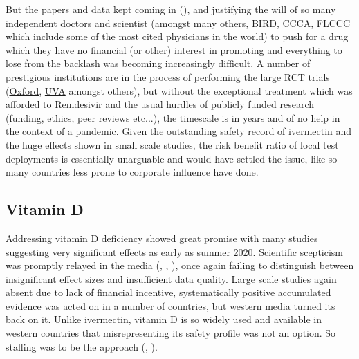 \documentclass[11pt,a4paper]{article}
\begin{document}
But the papers and data kept coming in (\cite{Bryant2021-ww}), and justifying the will of so many independent doctors and scientist (amongst many others, \href{https://bird-group.org/where-it-all-began/}{BIRD}, \href{https://www.canadiancovidcarealliance.org/treatment-protocols/}{CCCA}, \href{https://covid19criticalcare.com/ivermectin-in-covid-19/}{FLCCC} which include some of the most cited physicians in the world) to push for a drug which they have no financial (or other) interest in promoting and everything to lose from the backlash was becoming increasingly difficult. A number of prestigious institutions are in the process of performing the large RCT trials (\href{https://www.principletrial.org/news/ivermectin-to-be-investigated-as-a-possible-treatment-for-covid-19-in-oxford2019s-principle-trial}{Oxford}, \href{https://news.virginia.edu/content/uva-health-joins-national-trial-testing-medications-mild-moderate-covid-19}{UVA} amongst others), but without the exceptional treatment which was afforded to Remdesivir and the usual hurdles of publicly funded research (funding, ethics, peer reviews etc...), the timescale is in years and of no help in the context of a pandemic. Given the outstanding safety record of ivermectin and the huge effects shown in small scale studies, the risk benefit ratio of local test deployments is essentially unarguable and would have settled the issue, like so many countries less prone to corporate influence have done.

\subsection*{Vitamin D}

Addressing vitamin D deficiency showed great promise with many studies suggesting \href{https://c19vitamind.com/}{very significant effects} as early as summer 2020. \href{https://www.nice.org.uk/guidance/ng187}{Scientific scepticism} was promptly relayed in the media (\cite{guardian29062020}, \cite{guardian29032021}, \cite{bbc17112020}), once again failing to distinguish between insignificant effect sizes and insufficient data quality. Large scale studies again absent due to lack of financial incentive, systematically positive accumulated evidence was acted on in a number of countries, but western media turned its back on it. Unlike ivermectin, vitamin D is so widely used and available in western countries that misrepresenting its safety profile was not an option. So stalling was to be the approach (\cite{bbc05042021}, \cite{guardian29022021}). 
\end{document}
